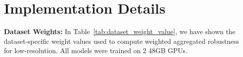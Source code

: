 
\section{Implementation Details}

\textbf{Dataset Weights:}
In Table~\ref{tab:dataset_weight_value}, we have shown the dataset-specific weight values used to compute weighted aggregated robustness for low-resolution. All models were trained on 2 48GB GPUs. 



